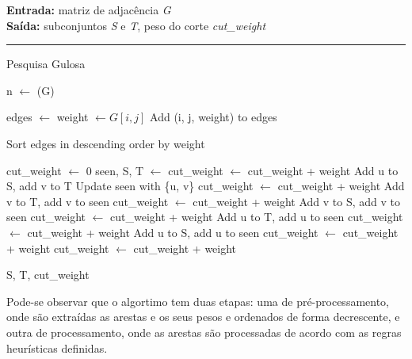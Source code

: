 \documentclass[mirror]{revdetua}
\begin{document}
\begin{algorithm}[H]
    \raggedright
    \textbf{Entrada:} matriz de adjacência \textit{G} \\
    \textbf{Saída:} subconjuntos \textit{S} e \textit{T}, peso do corte \textit{cut\_weight} \\
    \hrule 
    \caption{Pesquisa Gulosa}
    \begin{algorithmic}[1]
    
        \State n $\gets$ (G)

        \State edges $\gets$ 
                \State weight $\gets G[i, j]$
                \State Add (i, j, weight) to edges
            \EndFor
        \EndFor

        \State Sort edges in descending order by weight

        \State cut\_weight $\gets$ 0
        \State seen, S, T $\gets$ 
                \State cut\_weight $\gets$ cut\_weight + weight
                \State Add u to S, add v to T
                \State Update seen with \{u, v\}
                \State cut\_weight $\gets$ cut\_weight + weight
                \State Add v to T, add v to seen
                \State cut\_weight $\gets$ cut\_weight + weight
                \State Add v to S, add v to seen
                \State cut\_weight $\gets$ cut\_weight + weight
                \State Add u to T, add u to seen
                \State cut\_weight $\gets$ cut\_weight + weight
                \State Add u to S, add u to seen
                \State cut\_weight $\gets$ cut\_weight + weight
            \State cut\_weight $\gets$ cut\_weight + weight
            \Else
            \EndIf
        \EndFor

        \State \Return S, T, cut\_weight
    
    \end{algorithmic}
\end{algorithm}

Pode-se observar que o algortimo tem duas etapas: uma de pré-processamento, onde são extraídas as arestas e os seus pesos e ordenados de forma decrescente, e outra de processamento, onde as arestas são processadas de acordo com as regras heurísticas definidas.
\end{document}
